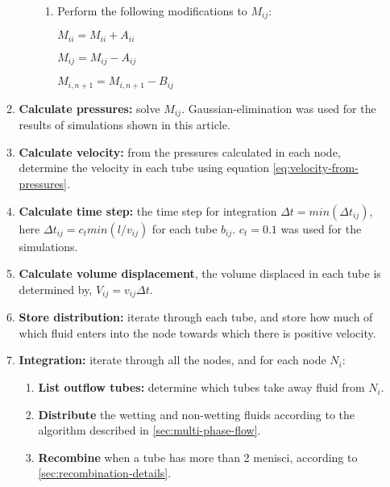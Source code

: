 \begin{enumerate}
\begin{enumerate}
\begin{enumerate}
\begin{enumerate}
					\item Perform the following modifications to $M_{ij}$:
					
					$M_{ii} = M_{ii} + A_{ii}$
					
					$M_{ij} = M_{ij} - A_{ij}$
					
					$M_{i,n + 1} = M_{i,n + 1} - B_{ij}$
				\end{enumerate}
			\end{enumerate}
			
			\item \textbf{Calculate pressures:} solve $M_{ij}$. Gaussian-elimination was used for the results of simulations shown in this article.
			
			\item \textbf{Calculate velocity:} from the pressures calculated in each node, determine the velocity in each tube using equation \ref{eq:velocity-from-pressures}.
			
			\item \textbf{Calculate time step:} the time step for integration $\Delta t = min(\Delta t_{ij})$, here $\Delta t_{ij} = c_{t} min(l/v_{ij})$ for each tube $b_{ij}$. $c_{t} = 0.1$ was used for the simulations.
			
			\item \textbf{Calculate volume displacement}, the volume displaced in each tube is determined by, $V_{ij} = v_{ij} \Delta t$.
			
			\item \textbf{Store distribution:} iterate through each tube, and store how much of which fluid enters into the node towards which there is positive velocity.
			
			\item \textbf{Integration:} iterate through all the nodes, and for each node $N_i$: 
			
			\begin{enumerate}
				\item \textbf{List outflow tubes:} determine which tubes take away fluid from $N_i$.
				
				\item \textbf{Distribute} the wetting and non-wetting fluids according to the algorithm described in \ref{sec:multi-phase-flow}.
				
				\item \textbf{Recombine} when a tube has more than 2 menisci, according to \ref{sec:recombination-details}.
			\end{enumerate}
				

\end{enumerate}
\end{enumerate}
